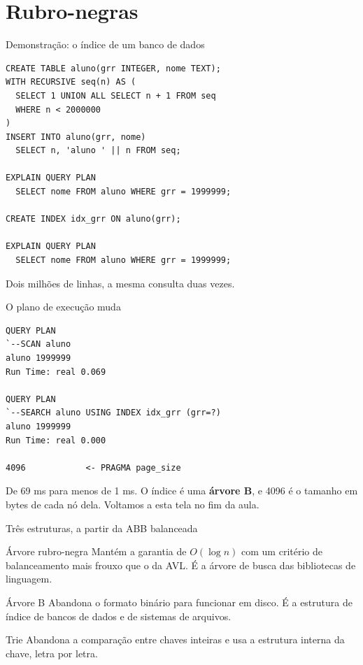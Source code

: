\documentclass{beamer}
\begin{document}
\section{Rubro-negras}

\begin{frame}[fragile]{Demonstração: o índice de um banco de dados}
	\begin{verbatim}
CREATE TABLE aluno(grr INTEGER, nome TEXT);
WITH RECURSIVE seq(n) AS (
  SELECT 1 UNION ALL SELECT n + 1 FROM seq
  WHERE n < 2000000
)
INSERT INTO aluno(grr, nome)
  SELECT n, 'aluno ' || n FROM seq;

EXPLAIN QUERY PLAN
  SELECT nome FROM aluno WHERE grr = 1999999;

CREATE INDEX idx_grr ON aluno(grr);

EXPLAIN QUERY PLAN
  SELECT nome FROM aluno WHERE grr = 1999999;
\end{verbatim}

	\vspace{0.2cm}
	Dois milhões de linhas, a mesma consulta duas vezes.
\end{frame}

\begin{frame}[fragile]{O plano de execução muda}
	\begin{verbatim}
QUERY PLAN
`--SCAN aluno
aluno 1999999
Run Time: real 0.069

QUERY PLAN
`--SEARCH aluno USING INDEX idx_grr (grr=?)
aluno 1999999
Run Time: real 0.000

4096            <- PRAGMA page_size
\end{verbatim}

	\vspace{0.2cm}
	De 69 ms para menos de 1 ms. O índice é uma \textbf{árvore B}, e 4096 é o
	tamanho em bytes de cada nó dela. Voltamos a esta tela no fim da aula.
\end{frame}

\begin{frame}{Três estruturas, a partir da ABB balanceada}
	\begin{block}{Árvore rubro-negra}
		Mantém a garantia de $O(\log n)$ com um critério de balanceamento mais
		frouxo que o da AVL. É a árvore de busca das bibliotecas de linguagem.
	\end{block}

	\begin{block}{Árvore B}
		Abandona o formato binário para funcionar em disco. É a estrutura de índice
		de bancos de dados e de sistemas de arquivos.
	\end{block}

	\begin{block}{Trie}
		Abandona a comparação entre chaves inteiras e usa a estrutura interna da
		chave, letra por letra.
	\end{block}
\end{frame}
\end{document}
